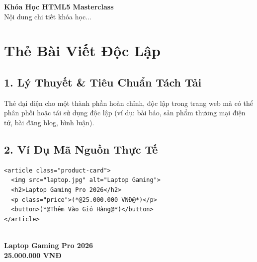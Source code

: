 \begin{browserWindow}
\sffamily
{\Large\bfseries Khóa Học HTML5 Masterclass}\\[3pt]
{\small Nội dung chi tiết khóa học...}
\end{browserWindow}

\section{Thẻ Bài Viết Độc Lập }
\subsection{1. Lý Thuyết \& Tiêu Chuẩn Tách Tải}
Thẻ  đại diện cho một thành phần hoàn chỉnh, độc lập trong trang web mà có thể phân phối hoặc tái sử dụng độc lập (ví dụ: bài báo, sản phẩm thương mại điện tử, bài đăng blog, bình luận).

\subsection{2. Ví Dụ Mã Nguồn Thực Tế}
\begin{codeWindow}
\begin{lstlisting}[language=HTML5]
<article class="product-card">
  <img src="laptop.jpg" alt="Laptop Gaming">
  <h2>Laptop Gaming Pro 2026</h2>
  <p class="price">(*@25.000.000 VNĐ@*)</p>
  <button>(*@Thêm Vào Giỏ Hàng@*)</button>
</article>
\end{lstlisting}
\end{codeWindow}

\begin{browserWindow}
\sffamily\small
\begin{tcolorbox}[colback=white, colframe=gray!30, width=0.65\linewidth, arc=6pt, drop shadow=black!5!white]
\centering
{} \\[4pt]
{\bfseries Laptop Gaming Pro 2026}\\[2pt]
\textcolor{accentOrange}{\bfseries 25.000.000 VNĐ}\\[4pt]
\end{tcolorbox}
\end{browserWindow}

